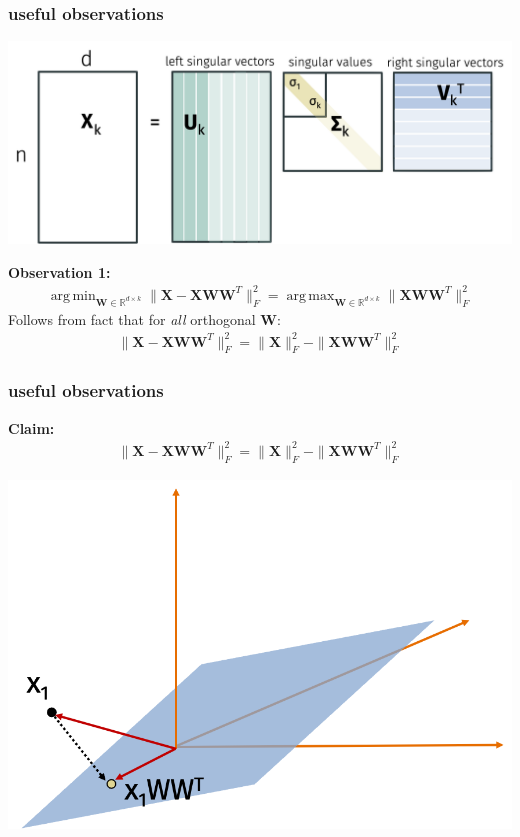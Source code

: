 \documentclass[compress]{beamer}
\newcommand{\bv}[1]{\mathbf{#1}}
\newcommand{\R}{\mathbb{R}}
\DeclareMathOperator*{\argmin}{arg\,min}
\DeclareMathOperator*{\argmax}{arg\,max}
\begin{document}
\begin{frame}[t]
	\frametitle{useful observations}
		\begin{center}
		\includegraphics[width=.7\textwidth]{svdk.png}
	\end{center} 
\textbf{Observation 1:}
\begin{align*}
	\argmin_{\bv{W} \in \R^{d\times k}} \|\bv{X} - \bv{X}\bv{W}\bv{W}^T\|_F^2 = \argmax_{\bv{W} \in \R^{d\times k}} \|\bv{X}\bv{W}\bv{W}^T\|_F^2
\end{align*}
{Follows from fact that for \emph{all} orthogonal $\bv{W}$:}
\begin{align*}
	 \|\bv{X} - \bv{X}\bv{W}\bv{W}^T\|_F^2 =  \|\bv{X}\|_F^2 - \|\bv{X}\bv{W}\bv{W}^T\|_F^2
\end{align*} 
\end{frame}

\begin{frame}[t]
	\frametitle{useful observations}
	\textbf{Claim:}
	 \begin{align*}
		\|\bv{X} - \bv{X}\bv{W}\bv{W}^T\|_F^2 =  \|\bv{X}\|_F^2 - \|\bv{X}\bv{W}\bv{W}^T\|_F^2
	\end{align*} 
	\begin{center}
	\includegraphics[width=.7\textwidth]{pythagorean.png}
\end{center} 
	
\end{frame}
\end{document}
